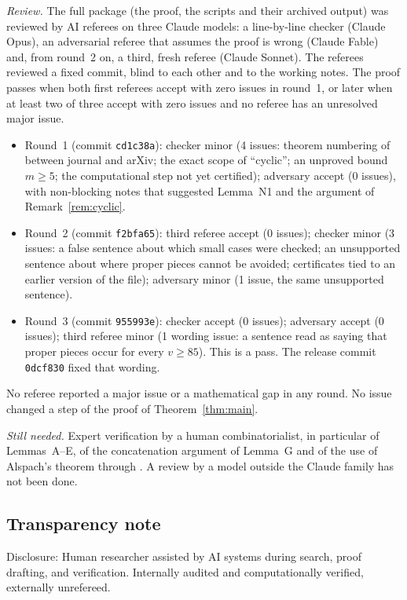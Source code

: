 \documentclass[11pt]{amsart}
\theoremstyle{plain}
\theoremstyle{definition}
\theoremstyle{remark}
\numberwithin{equation}{section}
\newcommand{\ttt}[1]{\texttt{#1}}
\begin{document}
\emph{Review.} The full package (the proof, the scripts and their archived output) was reviewed by AI referees on three Claude models: a line-by-line checker (Claude Opus), an adversarial referee that assumes the proof is wrong (Claude Fable) and, from round~2 on, a third, fresh referee (Claude Sonnet). The referees reviewed a fixed commit, blind to each other and to the working notes. The proof passes when both first referees accept with zero issues in round~1, or later when at least two of three accept with zero issues and no referee has an unresolved major issue.
\begin{itemize}
\item Round~1 (commit \ttt{cd1c38a}): checker minor (4 issues: theorem numbering of \cite{BP} between journal and arXiv; the exact scope of ``cyclic''; an unproved bound \(m\ge5\); the computational step not yet certified); adversary accept (0 issues), with non-blocking notes that suggested Lemma~N1 and the argument of Remark~\ref{rem:cyclic}.
\item Round~2 (commit \ttt{f2bfa65}): third referee accept (0 issues); checker minor (3 issues: a false sentence about which small cases were checked; an unsupported sentence about where proper pieces cannot be avoided; certificates tied to an earlier version of the file); adversary minor (1 issue, the same unsupported sentence).
\item Round~3 (commit \ttt{955993e}): checker accept (0 issues); adversary accept (0 issues); third referee minor (1 wording issue: a sentence read as saying that proper pieces occur for every \(v\ge85\)). This is a pass. The release commit \ttt{0dcf830} fixed that wording.
\end{itemize}
No referee reported a major issue or a mathematical gap in any round. No issue changed a step of the proof of Theorem~\ref{thm:main}.

\emph{Still needed.} Expert verification by a human combinatorialist, in particular of Lemmas~A--E, of the concatenation argument of Lemma~G and of the use of Alspach's theorem through \cite[Theorem~1.1]{BP}. A review by a model outside the Claude family has not been done.

\subsection*{Transparency note}

Disclosure: Human researcher assisted by AI systems during search, proof drafting, and verification. Internally audited and computationally verified, externally unrefereed.
\end{document}

